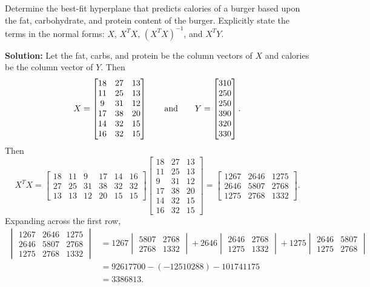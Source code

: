 Determine the best-fit hyperplane that predicts calories of a burger based upon the fat, carbohydrate, and protein content of the burger. Explicitly state the terms in the normal forms: $X$, $X^T  X$, $( X^T  X)^{-1}$, and $ X^T Y$.

\nnl \textbf{Solution: } Let the fat, carbs, and protein be the column vectors of $X$ and calories be the column vector of $Y$. Then
$$X = \begin{bmatrix}
    18 & 27 & 13\\
    11 & 25 & 13\\
    9 & 31 & 12\\
    17 & 38 & 20\\
    14 & 32 & 15\\
    16 & 32 & 15
\end{bmatrix} \qquad \text{and} \qquad Y = \begin{bmatrix}
    310 \\ 250 \\ 250 \\ 390 \\ 320 \\ 330
\end{bmatrix}.$$
Then
$$X^T X = \begin{bmatrix}
    18 & 11 & 9 & 17 & 14 & 16\\
    27 & 25 & 31 & 38 & 32 & 32\\
    13 & 13 & 12 & 20 & 15 & 15
\end{bmatrix}
\begin{bmatrix}
    18 & 27 & 13\\
    11 & 25 & 13\\
    9 & 31 & 12\\
    17 & 38 & 20\\
    14 & 32 & 15\\
    16 & 32 & 15
\end{bmatrix}
=\begin{bmatrix}
    1267 & 2646 & 1275 \\
    2646 & 5807 & 2768 \\
    1275 & 2768 & 1332
\end{bmatrix}.$$
Expanding across the first row,
\begin{align*}
    \begin{vmatrix}
        1267 & 2646 & 1275 \\
        2646 & 5807 & 2768 \\
        1275 & 2768 & 1332
    \end{vmatrix} &= 1267 \begin{vmatrix}
        5807 & 2768 \\
        2768 & 1332
    \end{vmatrix} + 2646 \begin{vmatrix}
        2646 & 2768\\
        1275 & 1332
    \end{vmatrix} + 1275 \begin{vmatrix}
        2646 & 5807 \\
        1275 & 2768
    \end{vmatrix}\\
    &= 92617700 - (-12510288) -101741175\\
    &= 3386813.
\end{align*}
